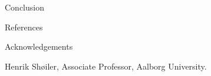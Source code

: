 \documentclass[final]{beamer}
\newlength{\onecolwid}
\begin{document}
\begin{frame}[t]
\begin{columns}[t]
\begin{column}{\onecolwid}
\begin{alertblock}{Conclusion\vspace{2pt}}
\centering
\vspace{.3cm}
\parbox{.95\textwidth}{

}\vspace{.3cm}
\end{alertblock}

\begin{alertblock}{References\vspace{2pt}}
\centering
\vspace{-.6cm}
\parbox{.98\textwidth}{
\nocite{FeedbackControl} %
\nocite{TrueTimeNew}
\printbibliography
}\vspace{-.6cm}
\end{alertblock}

\begin{alertblock}{Acknowledgements\vspace{2pt}}
\centering
\vspace{.2cm}
\parbox{.98\textwidth}{
Henrik Shøiler, Associate Professor, Aalborg University.
}\vspace{.275cm}
\end{alertblock}


\end{column} %

\end{columns} %

\end{frame} %
\end{document}
